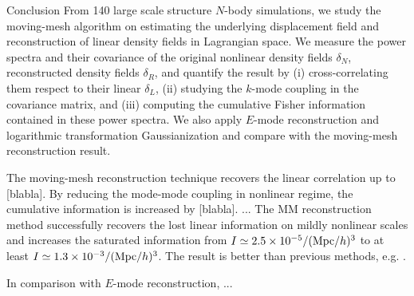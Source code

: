 \begin{section}{Conclusion}
  \label{sec:conclusion}
  From 140 large scale structure $N$-body simulations, 
  we study the moving-mesh algorithm on estimating the underlying displacement
  field and reconstruction of linear density fields in Lagrangian
  space. We measure the power spectra and their covariance of
  the original nonlinear density fields $\delta_N$, reconstructed density fields $\delta_R$,
  and quantify the result by (i) cross-correlating them respect to their linear $\delta_L$,
  (ii) studying the $k$-mode coupling in the covariance matrix, and (iii)
  computing the cumulative Fisher information contained
  in these power spectra. We also apply $E$-mode reconstruction
  and logarithmic transformation Gaussianization and compare
  with the moving-mesh reconstruction result.
  
  The moving-mesh reconstruction technique recovers the linear correlation
  up to [blabla]. By reducing the mode-mode coupling in nonlinear
  regime, the cumulative information is increased by [blabla].
  ...
  The MM reconstruction method successfully recovers the lost linear
  information on mildly nonlinear scales and increases the saturated
  information from $I \simeq 2.5 \times 10^{-5}/({\rm Mpc}/h)^3$
  to at least $I \simeq 1.3 \times 10^{-3}/({\rm Mpc}/h)^3$.  The result is
  better than previous methods,
  e.g. \cite{bib:Mark2006,bib:Mark2009,bib:Zhang2011,bib:Yu2012}.
  
  In comparison with $E$-mode reconstruction, ...
  


\end{section}
